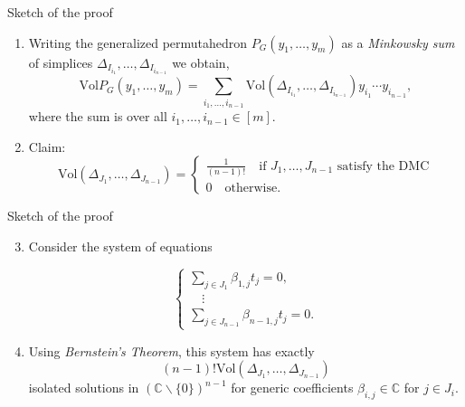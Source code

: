 \documentclass{beamer}
\begin{document}
\begin{frame}{Sketch of the proof}

    \begin{enumerate}
        \item Writing the generalized permutahedron $P_G(y_1,\dots,y_m)$ as a \textit{Minkowsky sum} of simplices $\Delta_{I_{i_1}}, \dots, \Delta_{I_{i_{n-1}}}$ we obtain,
        $$\text{Vol}P_G(y_1, \dots, y_m)= \sum_{i_1,\dots, i_{n-1}}\text{Vol}(\Delta_{I_{i_1}}, \dots, \Delta_{I_{i_{n-1}}})y_{i_1}\cdots y_{i_{n-1}},$$
where the sum is over all $i_1,\dots, i_{n-1} \in [m]$.
\pause
\vspace{0.5cm}
       \item Claim:
       $$\text{Vol}(\Delta_{J_1}, \dots, \Delta_{J_{n-1}})=
  \begin{cases}
    \frac{1}{(n-1)!} \quad \text{if } J_1, \dots, J_{n-1} \text{ satisfy the DMC}\\
0 \quad \text{otherwise.}
\end{cases}  $$

    \end{enumerate}

\end{frame}

\begin{frame}{Sketch of the proof}
\begin{enumerate}
\setcounter{enumi}{2}
    \item Consider the system of equations

\begin{center}
    $$\begin{cases}
      \sum_{j\in J_1} \beta_{1,j}t_j=0,\\
      \quad \vdots\\
      \sum_{j\in J_{n-1}} \beta_{n-1,j}t_j=0.
    \end{cases}$$
\end{center}

\pause
\vspace{0.5cm}
\item Using \textit{Bernstein's Theorem}, this system has exactly
$$(n-1)! \text{Vol}(\Delta_{J_1}, \dots, \Delta_{J_{n-1}})$$ isolated solutions in $(\mathbb{C}\backslash \{0\})^{n-1}$ for generic coefficients $\beta_{i,j}\in \mathbb{C}$ for $j \in J_i$.
\end{enumerate}
\end{frame}
\end{document}
